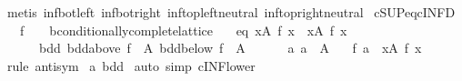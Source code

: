 \begin{isabellebody}
\ {\isacharparenleft}{\kern0pt}metis\ inf{\isacharunderscore}{\kern0pt}bot{\isacharunderscore}{\kern0pt}left\ inf{\isacharunderscore}{\kern0pt}bot{\isacharunderscore}{\kern0pt}right\ inf{\isacharunderscore}{\kern0pt}top{\isachardot}{\kern0pt}left{\isacharunderscore}{\kern0pt}neutral\ inf{\isacharunderscore}{\kern0pt}top{\isachardot}{\kern0pt}right{\isacharunderscore}{\kern0pt}neutral{\isacharparenright}{\kern0pt}\isanewline
{}\isamarkupfalse%
%
\endisatagproof
{\isafoldproof}%
%
\isadelimproof
\isanewline
%
\endisadelimproof
\isanewline
{}\isamarkupfalse%
\ cSUP{\isacharunderscore}{\kern0pt}eq{\isacharunderscore}{\kern0pt}cINF{\isacharunderscore}{\kern0pt}D{\isacharcolon}{\kern0pt}\isanewline
\ \ \ f\ {\isacharcolon}{\kern0pt}{\isacharcolon}{\kern0pt}\ {\isachardoublequoteopen}{\isacharunderscore}{\kern0pt}\ {\isasymRightarrow}\ {\isacharprime}{\kern0pt}b{\isacharcolon}{\kern0pt}{\isacharcolon}{\kern0pt}conditionally{\isacharunderscore}{\kern0pt}complete{\isacharunderscore}{\kern0pt}lattice{\isachardoublequoteclose}\isanewline
\ \ \ eq{\isacharcolon}{\kern0pt}\ {\isachardoublequoteopen}{\isacharparenleft}{\kern0pt}{\isasymSqunion}x{\isasymin}A{\isachardot}{\kern0pt}\ f\ x{\isacharparenright}{\kern0pt}\ {\isacharequal}{\kern0pt}\ {\isacharparenleft}{\kern0pt}{\isasymSqinter}x{\isasymin}A{\isachardot}{\kern0pt}\ f\ x{\isacharparenright}{\kern0pt}{\isachardoublequoteclose}\isanewline
\ \ \ \ \ \ bdd{\isacharcolon}{\kern0pt}\ {\isachardoublequoteopen}bdd{\isacharunderscore}{\kern0pt}above\ {\isacharparenleft}{\kern0pt}f\ {\isacharbackquote}{\kern0pt}\ A{\isacharparenright}{\kern0pt}{\isachardoublequoteclose}\ {\isachardoublequoteopen}bdd{\isacharunderscore}{\kern0pt}below\ {\isacharparenleft}{\kern0pt}f\ {\isacharbackquote}{\kern0pt}\ A{\isacharparenright}{\kern0pt}{\isachardoublequoteclose}\isanewline
\ \ \ \ \ \ a{\isacharcolon}{\kern0pt}\ {\isachardoublequoteopen}a\ {\isasymin}\ A{\isachardoublequoteclose}\isanewline
\ \ \ {\isachardoublequoteopen}f\ a\ {\isacharequal}{\kern0pt}\ {\isacharparenleft}{\kern0pt}{\isasymSqinter}x{\isasymin}A{\isachardot}{\kern0pt}\ f\ x{\isacharparenright}{\kern0pt}{\isachardoublequoteclose}\isanewline
%
\isadelimproof
%
\endisadelimproof
%
\isatagproof
{}\isamarkupfalse%
\ {\isacharparenleft}{\kern0pt}rule\ antisym{\isacharparenright}{\kern0pt}\isanewline
{}\isamarkupfalse%
\ a\ bdd\isanewline
{}\isamarkupfalse%
\ {\isacharparenleft}{\kern0pt}auto\ simp{\isacharcolon}{\kern0pt}\ cINF{\isacharunderscore}{\kern0pt}lower{\isacharparenright}{\kern0pt}\isanewline

\end{isabellebody}
